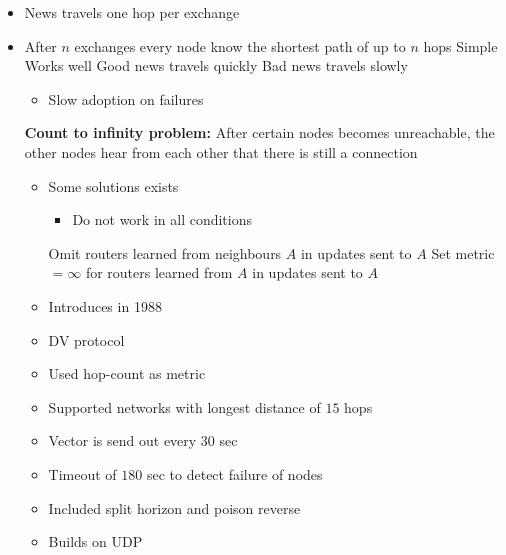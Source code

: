 \begin{itemize}
\begin{itemize}
            \item News travels one hop per exchange
            \item After $n$ exchanges every node know the shortest path of up to $n$ hops
            \ipro Simple
            \ipro Works well
            \ipro Good news travels quickly
            \icon Bad news travels slowly
                \begin{itemize}
                    \item Slow adoption on failures
                \end{itemize}
            \icon \textbf{Count to infinity problem:} After certain nodes becomes unreachable, the other nodes hear from each other that there is still a connection
                \begin{itemize}
                    \item Some solutions exists
                        \begin{itemize}
                            \item Do not work in all conditions
                        \end{itemize}
                     Omit routers learned from neighbours $A$ in updates sent to $A$
                     Set metric $=\infty$ for routers learned from $A$ in updates sent to $A$
                \end{itemize}
                \begin{itemize}
                    \item Introduces in 1988
                    \item DV protocol
                    \item Used hop-count as metric
                    \item Supported networks with longest distance of $15$ hops
                    \item Vector is send out every $30$ sec
                    \item Timeout of $180$ sec to detect failure of nodes
                    \item Included split horizon and poison reverse
                    \item Builds on UDP
                \end{itemize}
        \end{itemize}
    \begin{itemize}

\end{itemize}
\end{itemize}
